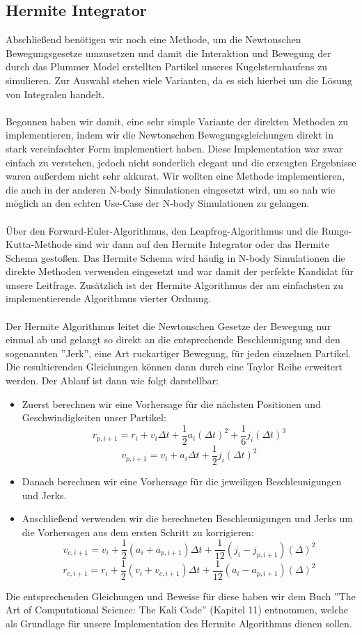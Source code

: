 \documentclass[
	12pt,
	a4paper,
	BCOR10mm,
	DIV14,
	headsepline,
	usegeometry,
]{scrreprt}
\begin{document}
\subsection{Hermite Integrator}
Abschließend benötigen wir noch eine Methode, um die Newtonschen Bewegungsgesetze umzusetzen und damit die Interaktion und Bewegung der durch das Plummer Model erstellten Partikel unseres Kugelsternhaufens zu simulieren. Zur Auswahl stehen viele Varianten, da es sich hierbei um die Lösung von Integralen handelt. \\\\ Begonnen haben wir damit, eine sehr simple Variante der direkten Methoden zu implementieren, indem wir die Newtonschen Bewegungsgleichungen direkt in stark vereinfachter Form implementiert haben. Diese Implementation war zwar einfach zu verstehen, jedoch nicht sonderlich elegant und die erzeugten Ergebnisse waren außerdem nicht sehr akkurat. Wir wollten eine Methode implementieren, die auch in der anderen N-body Simulationen eingesetzt wird, um so nah wie möglich an den echten Use-Case der N-body Simulationen zu gelangen. \\\\ Über den Forward-Euler-Algorithmus, den Leapfrog-Algorithmus und die Runge-Kutta-Methode sind wir dann auf den Hermite Integrator oder das Hermite Schema gestoßen. Das Hermite Schema wird häufig in N-body Simulationen die direkte Methoden verwenden eingesetzt und war damit der perfekte Kandidat für unsere Leitfrage. Zusätzlich ist der Hermite Algorithmus der am einfachsten zu implementierende Algorithmus vierter Ordnung. \\\\ Der Hermite Algorithmus leitet die Newtonschen Gesetze der Bewegung nur einmal ab und gelangt so direkt an die entsprechende Beschleunigung und den sogenannten ''Jerk'', eine Art ruckartiger Bewegung, für jeden einzelnen Partikel. Die resultierenden Gleichungen können dann durch eine Taylor Reihe erweitert werden. Der Ablauf ist dann wie folgt darstellbar:
\begin{itemize}
	\item Zuerst berechnen wir eine Vorhersage für die nächsten Positionen und Geschwindigkeiten unser Partikel: $$ r_{p,i+1} = r_{i} + v_{i}\Delta t + \frac{1}{2}a_{i}(\Delta t)^{2} + \frac{1}{6}j_{i}(\Delta t)^{3} $$ $$ v_{p,i+1} = v_{i} + a_{i}\Delta t + \frac{1}{2}j_{i}(\Delta t)^{2} $$
	\item Danach berechnen wir eine Vorhersage für die jeweiligen Beschleunigungen und Jerks. 
	\item Anschließend verwenden wir die berechneten Beschleunigungen und Jerks um die Vorhersagen aus dem ersten Schritt zu korrigieren: $$ v_{c,i+1} = v_{i} + \frac{1}{2}(a_{i} + a_{p,i+1})\Delta t + \frac{1}{12}(j_{i} - j_{p, i+1})(\Delta)^{2} $$ $$ r_{c,i+1} = r_{i} + \frac{1}{2}(v_{i} + v_{c,i+1})\Delta t + \frac{1}{12}(a_{i} - a_{p, i+1})(\Delta)^{2} $$
\end{itemize}
Die entsprechenden Gleichungen und Beweise für diese haben wir dem Buch ''The Art of Computational Science: The Kali Code'' \cite{kali_2}(Kapitel 11) entnommen, welche als Grundlage für unsere Implementation des Hermite Algorithmus dienen sollen. 
\end{document}
